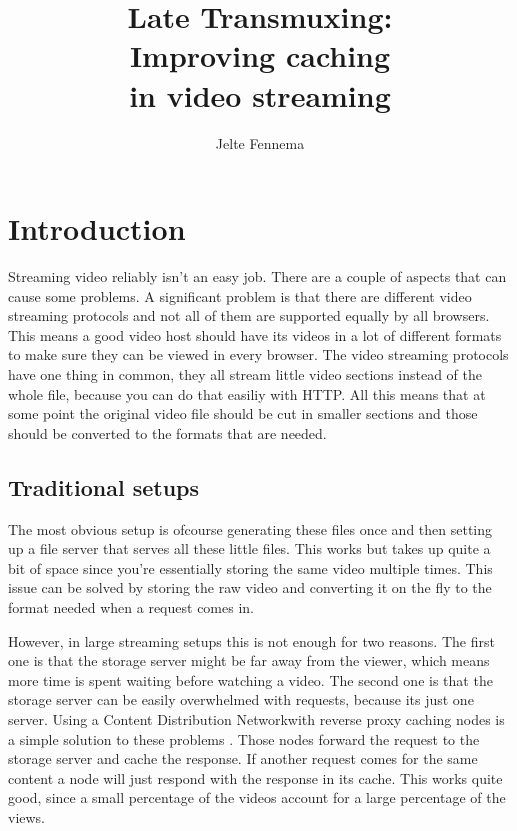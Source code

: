 \documentclass[twoside,openright]{uva-bachelor-thesis}
\title{Late Transmuxing:\\Improving caching \\in video streaming}
\author{Jelte Fennema}
\begin{document}
\maketitle

\begin{abstract}
\end{abstract}


\tableofcontents

\chapter{Introduction}
Streaming video reliably isn't an easy job. There are a couple of aspects that
can cause some problems. A significant problem is that there are different video
streaming protocols and not all of them are supported equally by all browsers.
This means a good video host should have its videos in a lot of different
formats to make sure they can be viewed in every browser. The video streaming
protocols have one thing in common, they all stream little video sections
instead of the whole file, because you can do that easiliy with
HTTP\autocite{http}. All this means that at some point the original video file
should be cut in smaller sections and those should be converted to the formats
that are needed.


\section{Traditional setups}
The most obvious setup is ofcourse generating these files once and then setting
up a file server that serves all these little files. This works but takes up
quite a bit of space since you're essentially storing the same video multiple
times. This issue can be solved by storing the raw video and converting it on
the fly to the format needed when a request comes in.

However, in large streaming setups this is not enough for two reasons. The first
one is that the storage server might be far away from the viewer, which means
more time is spent waiting before watching a video. The second one is that the
storage server can be easily overwhelmed with requests, because its just one
server. Using a Content Distribution
Networkwith reverse proxy caching nodes is a simple solution to these problems
\autocites{cdns}{revproxy}.  Those nodes forward the request to the storage
server and cache the response. If another request comes for the same content a
node will just respond with the response in its cache. This works quite good,
since a small percentage of the videos account for a large percentage of the
views.
\end{document}
